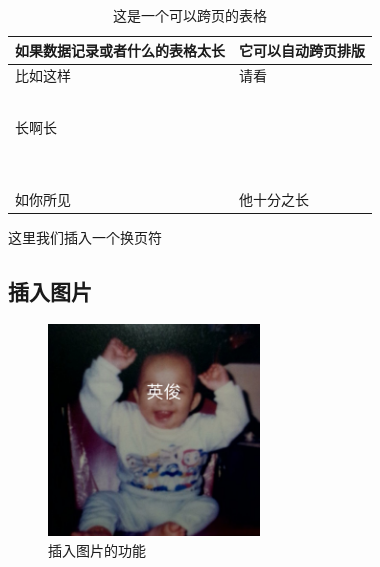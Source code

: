 \documentclass{spaexp}
\begin{document}
        \begin{longtable}{p{}||p{}}
            \caption{这是一个可以跨页的表格}\\
            \toprule
            如果数据记录或者什么的表格太长 & 它可以自动跨页排版 \\ \hline
            比如这样 & 请看 \\ \hline
            & \\ \hline
            & \\ \hline
            & \\ \hline
            & \\ \hline
            & \\ \hline
            长啊长 & \\ \hline
            & \\ \hline
            & \\ \hline
            & \\ \hline
            & \\ \hline
            & \\ \hline
            & \\ \hline
            & \\ \hline
            & \\ \hline
            & \\ \hline
            如你所见 & 他十分之长 \\ 
            \bottomrule 
        \end{longtable}
        这里我们插入一个换页符
        \clearpage
    \subsection{插入图片}
        \begin{figure}[h]
            \ct
            \caption{插入图片的功能}\label{fig:handsomeBOY}
            \includegraphics[width = 0.5\textwidth]{img/data1.png}
        \end{figure}
\end{document}
